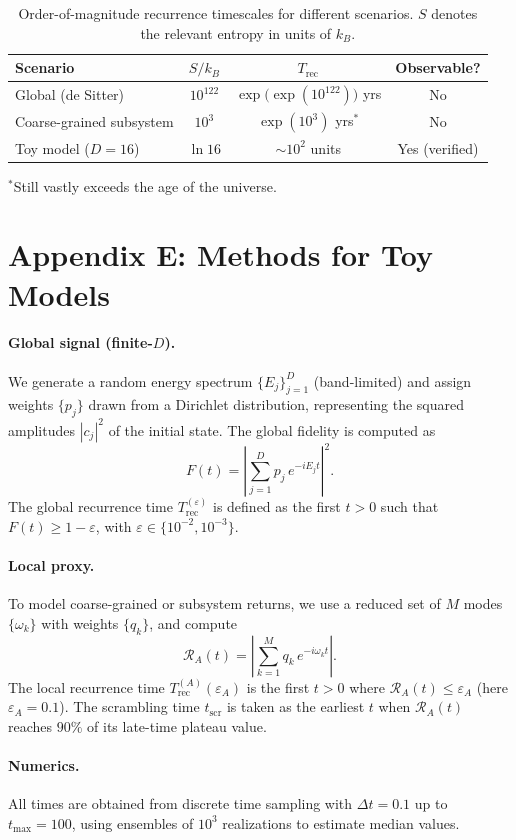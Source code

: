\documentclass[12pt]{article}
\newcommand{\Trec}{T_{\text{rec}}}
\newcommand{\TrecA}{T^{(A)}_{\text{rec}}}
\newcommand{\tscr}{t_{\text{scr}}}
\theoremstyle{remark}
\begin{document}
\begin{table}[H]
\centering
\caption{Order-of-magnitude recurrence timescales for different scenarios. 
$S$ denotes the relevant entropy in units of $k_B$.}
\vspace{0.2cm}
\begin{tabular}{lccc}
\hline
\textbf{Scenario} & \textbf{$S/k_B$} & \textbf{$\Trec$} & \textbf{Observable?} \\
\hline
Global (de Sitter) & $10^{122}$ & $\exp\!\big(\exp(10^{122})\big)$ yrs & No \\
Coarse-grained subsystem & $10^{3}$ & $\exp(10^{3})$ yrs$^{\ast}$ & No \\
Toy model ($D=16$) & $\ln 16$ & $\sim 10^{2}$ units & Yes (verified) \\
\hline
\end{tabular}
\label{tab:timescales}
\end{table}
\vspace{-0.3cm}
{\footnotesize $^{\ast}$Still vastly exceeds the age of the universe.}

\section*{Appendix E: Methods for Toy Models}
\label{app:methods-toys}

\paragraph{Global signal (finite-$D$).}
We generate a random energy spectrum $\{E_j\}_{j=1}^D$ (band-limited) and assign weights $\{p_j\}$ drawn from a Dirichlet distribution, representing the squared amplitudes $|c_j|^2$ of the initial state.
The global fidelity is computed as
\[
F(t) = \left| \sum_{j=1}^D p_j \, e^{-i E_j t} \right|^2 .
\]
The global recurrence time $\Trec^{(\varepsilon)}$ is defined as the first $t>0$ such that $F(t) \geq 1-\varepsilon$, with $\varepsilon \in \{10^{-2}, 10^{-3}\}$.

\paragraph{Local proxy.}
To model coarse-grained or subsystem returns, we use a reduced set of $M$ modes $\{\omega_k\}$ with weights $\{q_k\}$, and compute
\[
\mathcal{R}_A(t) = \left| \sum_{k=1}^M q_k \, e^{-i \omega_k t} \right| .
\]
The local recurrence time $\TrecA(\varepsilon_A)$ is the first $t>0$ where $\mathcal{R}_A(t) \leq \varepsilon_A$ (here $\varepsilon_A = 0.1$).
The scrambling time $\tscr$ is taken as the earliest $t$ when $\mathcal{R}_A(t)$ reaches $90\%$ of its late-time plateau value.

\paragraph{Numerics.}
All times are obtained from discrete time sampling with $\Delta t = 0.1$ up to $t_{\max} = 100$, using ensembles of $10^3$ realizations to estimate median values.
\end{document}
